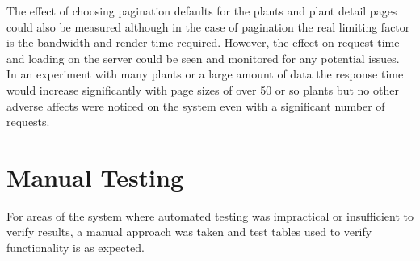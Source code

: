 The effect of choosing pagination defaults for the plants and plant detail pages could also be measured although in the case of pagination the real limiting factor is the bandwidth and render time required. However, the effect on request time and loading on the server could be seen and monitored for any potential issues. In an experiment with many plants or a large amount of data the response time would increase significantly with page sizes of over 50 or so plants but no other adverse affects were noticed on the system even with a significant number of requests.



\section{Manual Testing}
For areas of the system where automated testing was impractical or insufficient to verify results, a manual approach was taken and test tables used to verify functionality is as expected. 

